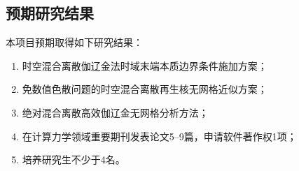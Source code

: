 \subsection{预期研究结果}
本项目预期取得如下研究结果：

\begin{enumerate}[label=（\theenumi）,left=24pt]
    \item 时空混合离散伽辽金法时域末端本质边界条件施加方案；
    \item 免数值色散问题的时空混合离散再生核无网格近似方案；
    \item 绝对混合离散高效伽辽金无网格分析方法；
    \item 在计算力学领域重要期刊发表论文5--9篇，申请软件著作权1项；
    \item 培养研究生不少于4名。
\end{enumerate}
